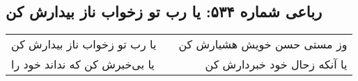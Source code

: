 \begin{center}
\section*{رباعی شماره ۵۳۴: یا رب تو زخواب ناز بیدارش کن}
\label{sec:sh534}
\begin{longtable}{l p{0.5cm} r}
یا رب تو زخواب ناز بیدارش کن
&&
وز مستی حسن خویش هشیارش کن
\\
یا بی‌خبرش کن که نداند خود را
&&
یا آنکه زحال خود خبردارش کن
\\
\end{longtable}
\end{center}

